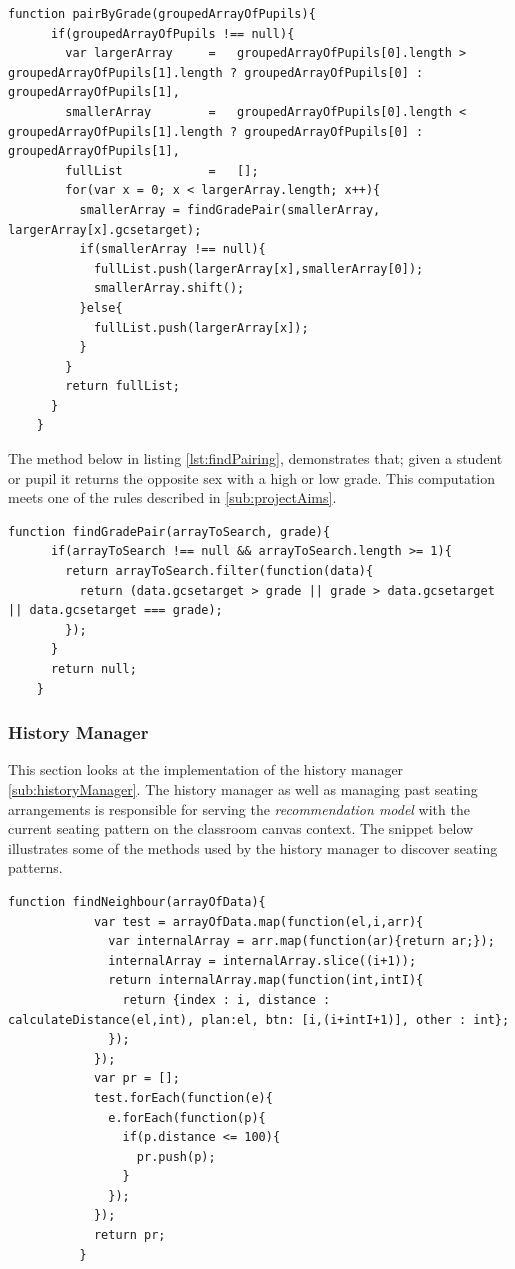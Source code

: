 \begin{lstlisting}[caption={Pair by grade}, label={lst:gradePairing}]
    function pairByGrade(groupedArrayOfPupils){
      if(groupedArrayOfPupils !== null){
        var largerArray     =   groupedArrayOfPupils[0].length > groupedArrayOfPupils[1].length ? groupedArrayOfPupils[0] : groupedArrayOfPupils[1],
        smallerArray        =   groupedArrayOfPupils[0].length < groupedArrayOfPupils[1].length ? groupedArrayOfPupils[0] : groupedArrayOfPupils[1],
        fullList            =   [];
        for(var x = 0; x < largerArray.length; x++){
          smallerArray = findGradePair(smallerArray, largerArray[x].gcsetarget);
          if(smallerArray !== null){
            fullList.push(largerArray[x],smallerArray[0]);
            smallerArray.shift();
          }else{
            fullList.push(largerArray[x]);
          }
        }
        return fullList;
      }
    }
\end{lstlisting}

The method below in listing \ref{lst:findPairing}, demonstrates that; given a student or pupil it returns the opposite sex with a high or low grade. This computation meets one of the rules described in \ref{sub:projectAims}. 

\begin{lstlisting}[caption={find grade pairing}, label={lst:findPairing}]
    function findGradePair(arrayToSearch, grade){
      if(arrayToSearch !== null && arrayToSearch.length >= 1){
        return arrayToSearch.filter(function(data){
          return (data.gcsetarget > grade || grade > data.gcsetarget || data.gcsetarget === grade);
        });
      }
      return null;
    }
\end{lstlisting}

\subsubsection{History Manager}
This section looks at the implementation of the history manager \ref{sub:historyManager}. The history manager as well as managing past seating arrangements is responsible for serving the \emph{recommendation model} with the current seating pattern on the classroom canvas context. The snippet below illustrates some of the methods used by the history manager to discover seating patterns.

\begin{lstlisting}[caption={Finds pairings}, label={lst:pairNeighbours}]
    function findNeighbour(arrayOfData){
            var test = arrayOfData.map(function(el,i,arr){
              var internalArray = arr.map(function(ar){return ar;});
              internalArray = internalArray.slice((i+1));
              return internalArray.map(function(int,intI){
                return {index : i, distance : calculateDistance(el,int), plan:el, btn: [i,(i+intI+1)], other : int};
              });
            });
            var pr = [];
            test.forEach(function(e){
              e.forEach(function(p){
                if(p.distance <= 100){
                  pr.push(p);
                }
              });
            });
            return pr;
          }
\end{lstlisting}

